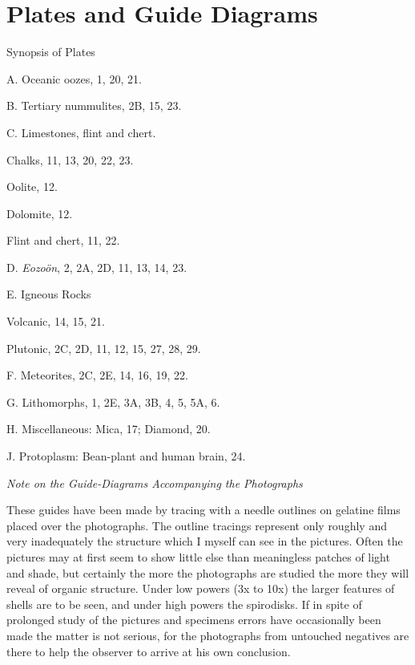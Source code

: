 \documentclass[a4paper, 12pt, oneside]{article}
\begin{document}
\section{Plates and Guide Diagrams}
\centerline{Synopsis of Plates}
\bigskip
\begin{description}
    \item A. Oceanic oozes, 1, 20, 21.
    \item B. Tertiary nummulites, 2B, 15, 23.
    \item C. Limestones, flint and chert.
    \item\hspace{15mm}Chalks, 11, 13, 20, 22, 23.
    \item\hspace{15mm}Oolite, 12.
    \item\hspace{15mm}Dolomite, 12.
    \item\hspace{15mm}Flint and chert, 11, 22.
    \item D. \emph{Eozoön}, 2, 2A, 2D, 11, 13, 14, 23.
    \item E. Igneous Rocks
    \item\hspace{15mm}Volcanic, 14, 15, 21.
    \item\hspace{15mm}Plutonic, 2C, 2D, 11, 12, 15, 27, 28, 29.
    \item F. Meteorites, 2C, 2E, 14, 16, 19, 22.
    \item G. Lithomorphs, 1, 2E, 3A, 3B, 4, 5, 5A, 6.
    \item H. Miscellaneous: Mica, 17; Diamond, 20.
    \item J. Protoplasm: Bean-plant and human brain, 24.
\end{description}

\bigskip
\centerline{\emph{Note on the Guide-Diagrams Accompanying the Photographs}}

These guides have been made by tracing with a needle outlines on gelatine films placed over the photographs. The outline tracings represent only roughly and very inadequately the structure which I myself can see in the pictures. Often the pictures may at first seem to show little else than meaningless patches of light and shade, but certainly the more the photographs are studied the more they will reveal of organic structure. Under low powers (3x to 10x) the larger features of shells are to be seen, and under high powers the spirodisks. If in spite of prolonged study of the pictures and specimens errors have occasionally been made the matter is not serious, for the photographs from untouched negatives are there to help the observer to arrive at his own conclusion.
\end{document}
